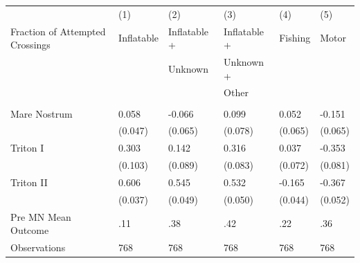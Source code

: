  \begin{tabular}{p{5cm}C{3cm}C{3cm}C{3cm}C{3cm}C{3cm}} \toprule\toprule   & (1)         & (2)       & (3)     & (4)      & (5)       \\ Fraction of Attempted Crossings       & Inflatable   & Inflatable + & Inflatable + & Fishing & Motor                     \\                                            &    & Unknown & Unknown + &  &                      \\                                            &    &  & Other &  &                      \\ \hline                          &        &       &          &     &                           \\ 
Mare Nostrum        &       0.058&      -0.066&       0.099&       0.052&      -0.151\\
                    &     (0.047)&     (0.065)&     (0.078)&     (0.065)&     (0.065)\\
Triton I            &       0.303&       0.142&       0.316&       0.037&      -0.353\\
                    &     (0.103)&     (0.089)&     (0.083)&     (0.072)&     (0.081)\\
Triton II           &       0.606&       0.545&       0.532&      -0.165&      -0.367\\
                    &     (0.037)&     (0.049)&     (0.050)&     (0.044)&     (0.052)\\
         \midrule Pre MN Mean Outcome  & .11 & .38 & .42 & .22 & .36 \\         
Observations        &         768&         768&         768&         768&         768\\
         \bottomrule         \end{tabular}         
